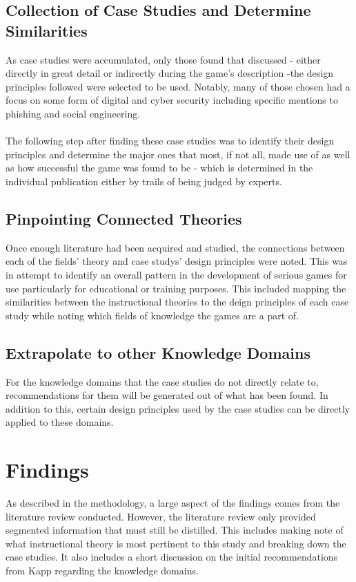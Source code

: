 \documentclass[conference]{IEEEtran}
\begin{document}
\subsection{Collection of Case Studies and Determine Similarities}
As case studies were accumulated, only those found that discussed - either directly in great detail or indirectly during the game's description -the design principles followed were selected to be used. Notably, many of those chosen had a focus on some form of digital and cyber security including specific mentions to phishing and social engineering\cite{Sheng2007, Dincelli2020}. 
\\\\
The following step after finding these case studies was to identify their design principles and determine the major ones that most, if not all, made use of as well as how successful the game was found to be - which is determined in the individual publication either by trails of being judged by experts.

\subsection{Pinpointing Connected Theories}
Once enough literature had been acquired and studied, the connections between each of the fields' theory and case studys' design principles were noted. This was in attempt to identify an overall pattern in the development of serious games for use particularly for educational or training purposes. This included mapping the similarities between the instructional theories to the deign principles of each case study while noting which fields of knowledge the games are a part of.  

\subsection{Extrapolate to other Knowledge Domains}
For the knowledge domains that the case studies do not directly relate to, recommendations for them will be generated out of what has been found. In addition to this, certain design principles used by the case studies can be directly applied to these domains.

\section{Findings}
As described in the methodology, a large aspect of the findings comes from the literature review conducted. However, the literature review only provided segmented information that must still be distilled. This includes making note of what instructional theory is most pertinent to this study and breaking down the case studies. It also includes a short discussion on the initial recommendations from Kapp\cite{Kapp2012a} regarding the knowledge domains.
\end{document}
